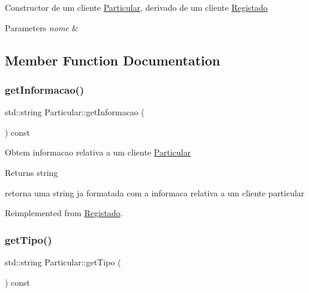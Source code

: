 Constructor de um cliente \hyperlink{class_particular}{Particular}, derivado de um cliente \hyperlink{class_registado}{Registado}


\begin{DoxyParams}{Parameters}
{\em nome} & \\
\hline
\end{DoxyParams}


\subsection{Member Function Documentation}
\hypertarget{class_particular_acde85dcb3d26ca3afe131fb4c35763c8}{}\label{class_particular_acde85dcb3d26ca3afe131fb4c35763c8} 
\subsubsection{\texorpdfstring{get\+Informacao()}{getInformacao()}}
{\footnotesize\ttfamily std\+::string Particular\+::get\+Informacao (\begin{DoxyParamCaption}{ }\end{DoxyParamCaption}) const\hspace{0.3cm}{\ttfamily [virtual]}}

Obtem informacao relativa a um cliente \hyperlink{class_particular}{Particular}

\begin{DoxyReturn}{Returns}
string
\end{DoxyReturn}
retorna uma string ja formatada com a informaca relativa a um cliente particular 

Reimplemented from \hyperlink{class_registado_a7017f0d74afd44459c3d6affcb303d52}{Registado}.

\hypertarget{class_particular_ac7fc22a792b8c711d5f424ad9af19755}{}\label{class_particular_ac7fc22a792b8c711d5f424ad9af19755} 
\subsubsection{\texorpdfstring{get\+Tipo()}{getTipo()}}
{\footnotesize\ttfamily std\+::string Particular\+::get\+Tipo (\begin{DoxyParamCaption}{ }\end{DoxyParamCaption}) const\hspace{0.3cm}{\ttfamily [virtual]}}


